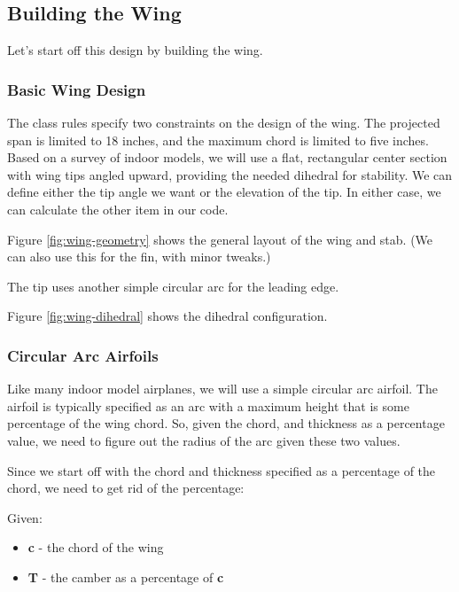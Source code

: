 \subsection{Building the Wing}

Let's start off this design by building the wing.

\subsubsection*{Basic Wing Design}

The class rules specify two constraints on the design of the wing. The projected
span is limited to 18 inches, and the maximum chord is limited to five inches.
Based on a survey of indoor models, we will use a flat, rectangular center section with wing
tips angled upward, providing the needed dihedral for stability. We can define
either the tip angle we want or the elevation of the tip. In either case, we can
calculate the other item in our code.


Figure \ref{fig:wing-geometry} shows the general layout of the wing and stab. (We
can also use this for the fin, with minor tweaks.)


The tip uses another simple circular arc for the leading edge.

Figure \ref{fig:wing-dihedral} shows the dihedral configuration.


\subsubsection{Circular Arc Airfoils}

Like many indoor model airplanes, we will use a simple circular arc airfoil.
The airfoil is typically specified as an arc with a maximum height that is some
percentage of the wing chord.  So, given the chord, and thickness as a
percentage value, we need to figure out the radius of the arc given these two
values.

Since we start off with the chord and thickness specified as a percentage of the chord, we
need to get rid of the percentage:

Given:

\begin{itemize}
  \item{{\bf c} - the chord of the wing}
  \item{{\bf T} - the camber as a percentage of {\bf c}}
\end{itemize}

